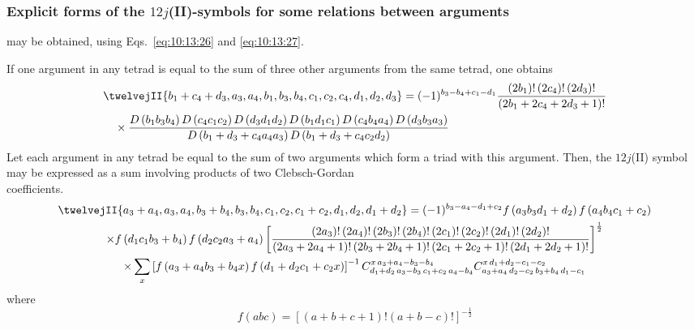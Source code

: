 \subsubsection{Explicit forms of the $12j$(II)-symbols for some relations between arguments}
may be obtained, using Eqs.~\eqref{eq:10:13:26} and \eqref{eq:10:13:27}.

If one argument in any tetrad is equal to the sum of three other arguments from the same tetrad, one obtains
\begin{align}
& \twelvejII{b_{1}+c_{4}+d_{3},a_{3},a_{4},b_{1},b_{3},b_{4},c_{1},c_{2},c_{4},d_{1},d_{2},d_{3}}=(-1)^{b_{3}-b_{4}+c_{1}-d_{1}} \frac{\left(2 b_{1}\right)!\left(2 c_{4}\right)!\left(2 d_{3}\right)!}{\left(2 b_{1}+2 c_{4}+2 d_{3}+1\right)!}  \notag\\
& \quad \times \frac{D\left(b_{1} b_{3} b_{4}\right) D\left(c_{4} c_{1} c_{2}\right) D\left(d_{3} d_{1} d_{2}\right) D\left(b_{1} d_{1} c_{1}\right) D\left(c_{4} b_{4} a_{4}\right) D\left(d_{3} b_{3} a_{3}\right)}{D\left(b_{1}+d_{3}+c_{4} a_{4} a_{3}\right) D\left(b_{1}+d_{3}+c_{4} c_{2} d_{2}\right)} \label{eq:10:13:30}
\end{align}
Let each argument in any tetrad be equal to the sum of two arguments which form a triad with this argument. Then, the $12j$(II) symbol may be expressed as a sum involving products of two Clebsch-Gordan\\
coefficients.
\begin{gather}
\twelvejII{a_{3}+a_{4},a_{3},a_{4},b_{3}+b_{4},b_{3},b_{4},c_{1},c_{2},c_{1}+c_{2},d_{1},d_{2},d_{1}+d_{2}}=(-1)^{b_{3}-a_{4}-d_{1}+c_{2}} f\left(a_{3} b_{3} d_{1}+d_{2}\right) f\left(a_{4} b_{4} c_{1}+c_{2}\right)  \notag\\
\times f\left(d_{1} c_{1} b_{3}+b_{4}\right) f\left(d_{2} c_{2} a_{3}+a_{4}\right)\left[\frac{\left(2 a_{3}\right)!\left(2 a_{4}\right)!\left(2 b_{3}\right)!\left(2 b_{4}\right)!\left(2 c_{1}\right)!\left(2 c_{2}\right)!\left(2 d_{1}\right)!\left(2 d_{2}\right)!}{\left(2 a_{3}+2 a_{4}+1\right)!\left(2 b_{3}+2 b_{4}+1\right)!\left(2 c_{1}+2 c_{2}+1\right)!\left(2 d_{1}+2 d_{2}+1\right)!}\right]^{\frac{1}{2}}  \notag\\
\times \sum_{x}\left[f\left(a_{3}+a_{4} b_{3}+b_{4} x\right) f\left(d_{1}+d_{2} c_{1}+c_{2} x\right)\right]^{-1} \clebsch{d_{1}+d_{2}}{a_{3}-b_{3}}{c_{1}+c_{2}}{a_{4}-b_{4}}{x}{a_{3}+a_{4}-b_{3}-b_{4}} \clebsch{a_{3}+a_{4}}{d_{2}-c_{2}}{b_{3}+b_{4}}{d_{1}-c_{1}}{x}{d_{1}+d_{2}-c_{1}-c_{2}} \label{eq:10:13:31}
\end{gather}
where
\begin{equation}
f(a b c)=[(a+b+c+1)!(a+b-c)!]^{-\frac{1}{2}} \label{eq:10:13:32}
\end{equation}
